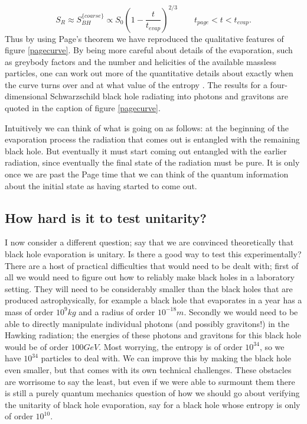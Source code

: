 \documentclass[12pt]{article}
\newcommand{\be}{\begin{equation}}
\newcommand{\ee}{\end{equation}}
\begin{document}
\be
S_R\approx S_{BH}^{\{coarse\}}\propto S_0\left(1-\frac{t}{t_{evap}}\right)^{2/3} \qquad t_{page}<t<t_{evap}.
\ee
Thus by using Page's theorem we have reproduced the qualitative features of figure \ref{pagecurve}.  By being more careful about details of the evaporation, such as greybody factors and the number and helicities of the available massless particles, one can work out more of the quantitative details about exactly when the curve turns over and at what value of the entropy \cite{Page:2013dx}.  The results for a four-dimensional Schwarzschild black hole radiating into photons and gravitons are quoted in the caption of figure \ref{pagecurve}.

Intuitively we can think of what is going on as follows: at the beginning of the evaporation process the radiation that comes out is entangled with the remaining black hole.  But eventually it must start coming out entangled with the earlier radiation, since eventually the final state of the radiation must be pure.  It is only once we are past the Page time that we can think of the quantum information about the initial state as having started to come out.

\subsection{How hard is it to test unitarity?}\label{testUsec}
I now consider a different question; say that we are convinced theoretically that black hole evaporation is unitary.  Is there a good way to test this experimentally?  There are a host of practical difficulties that would need to be dealt with; first of all we would need to figure out how to reliably make black holes in a laboratory setting.  They will need to be considerably smaller than the black holes that are produced astrophysically, for example a black hole that evaporates in a year has a mass of order $10^9 kg$ and a radius of order $10^{-18}m$.  Secondly we would need to be able to directly manipulate individual photons (and possibly gravitons!) in the Hawking radiation; the energies of these photons and gravitons for this black hole would be of order $100GeV$. Most worrying, the entropy is of order $10^{34}$, so we have $10^{34}$ particles to deal with.  We can improve this by making the black hole even smaller, but that comes with its own technical challenges.  These obstacles are worrisome to say the least, but even if we were able to surmount them there is still a purely quantum mechanics question of how we should go about verifying the unitarity of black hole evaporation, say for a black hole whose entropy is only of order $10^{10}$.     
\end{document}
